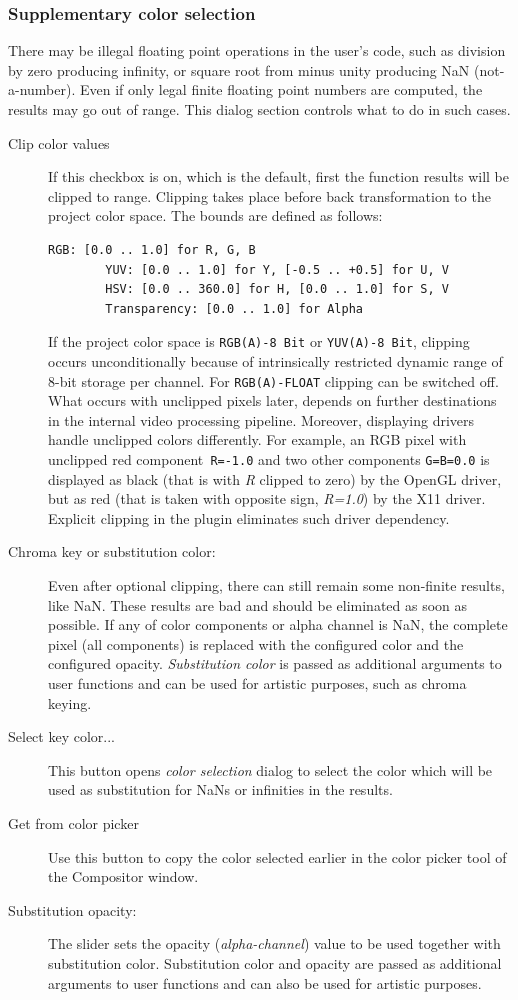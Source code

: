 \subsubsection*{Supplementary color selection}
\label{ssub:sup_color_selction}

There may be illegal floating point operations in the user's code, such as division by zero producing infinity, or square root from minus unity producing NaN (not-a-number). Even if only legal finite floating point numbers are computed, the results may go out of range. This dialog section controls what to do in such cases.

\begin{description}
	\item[Clip color values] If this checkbox is on, which is the default, first the function results will be clipped to range. Clipping takes place before back transformation to the project color space. The bounds are defined as follows:
	\begin{lstlisting}[style=sh]
		RGB: [0.0 .. 1.0] for R, G, B
		YUV: [0.0 .. 1.0] for Y, [-0.5 .. +0.5] for U, V
		HSV: [0.0 .. 360.0] for H, [0.0 .. 1.0] for S, V
		Transparency: [0.0 .. 1.0] for Alpha
	\end{lstlisting}
	If the project color space is \texttt{RGB(A)-8 Bit} or \texttt{YUV(A)-8 Bit}, clipping occurs unconditionally because of intrinsically restricted dynamic range of 8-bit storage per channel. For \texttt{RGB(A)-FLOAT} clipping can be switched off. What occurs with unclipped pixels later, depends on further destinations in the internal video processing pipeline. Moreover, displaying drivers handle unclipped colors differently. For example, an RGB pixel with unclipped red component\texttt{ R=-1.0} and two other components \texttt{G=B=0.0} is displayed as black (that is with \textit{R} clipped to zero) by the OpenGL driver, but as red (that is taken with opposite sign, \textit{R=1.0}) by the X11 driver. Explicit clipping in the plugin eliminates such driver dependency.
	\item[Chroma key or substitution color:] Even after optional clipping, there can still remain some non-finite results, like NaN. These results are bad and should be eliminated as soon as possible. If any of color components or alpha channel is NaN, the complete pixel (all components) is replaced with the configured color and the configured opacity.
\textit{Substitution color} is passed as additional arguments to user functions and can be used for artistic purposes, such as chroma keying.
	\item[Select key color...] This button opens \textit{color selection} dialog to select the color which will be used as substitution for NaNs or infinities in the results.
	\item[Get from color picker] Use this button to copy the color selected earlier in the color picker tool of the \CGG{} Compositor window.
	\item[Substitution opacity:] The slider sets the opacity (\textit{alpha-channel}) value to be used together with substitution color. Substitution color and opacity are passed as additional arguments to user functions and can also be used for artistic purposes.
\end{description}


